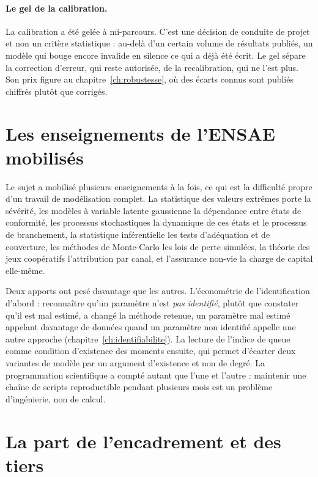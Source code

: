 \paragraph{Le gel de la calibration.} La calibration a été gelée à mi-parcours.
C'est une décision de conduite de projet et non un critère statistique : au-delà
d'un certain volume de résultats publiés, un modèle qui bouge encore invalide en
silence ce qui a déjà été écrit. Le gel sépare la correction d'erreur, qui reste
autorisée, de la recalibration, qui ne l'est plus. Son prix figure au
chapitre~\ref{ch:robustesse}, où des écarts connus sont publiés chiffrés plutôt que
corrigés.

\section{Les enseignements de l'ENSAE mobilisés}
\label{ens:ensae}

Le sujet a mobilisé plusieurs enseignements à la fois, ce qui est la difficulté
propre d'un travail de modélisation complet. La statistique des valeurs extrêmes
porte la sévérité, les modèles à variable latente gaussienne la dépendance entre
états de conformité, les processus stochastiques la dynamique de ces états et le
processus de branchement, la statistique inférentielle les tests d'adéquation et de
couverture, les méthodes de Monte-Carlo les lois de perte simulées, la théorie des
jeux coopératifs l'attribution par canal, et l'assurance non-vie la charge de capital
elle-même.

Deux apports ont pesé davantage que les autres. L'économétrie de l'identification
d'abord : reconnaître qu'un paramètre n'est \emph{pas identifié}, plutôt que constater
qu'il est mal estimé, a changé la méthode retenue, un paramètre mal estimé appelant
davantage de données quand un paramètre non identifié appelle une autre approche
(chapitre~\ref{ch:identifiabilite}). La lecture de l'indice de queue comme condition
d'existence des moments ensuite, qui permet d'écarter deux variantes de modèle par un
argument d'existence et non de degré. La programmation scientifique a compté autant
que l'une et l'autre : maintenir une chaîne de scripts reproductible pendant
plusieurs mois est un problème d'ingénierie, non de calcul.

\section{La part de l'encadrement et des tiers}
\label{ens:encadrement}

